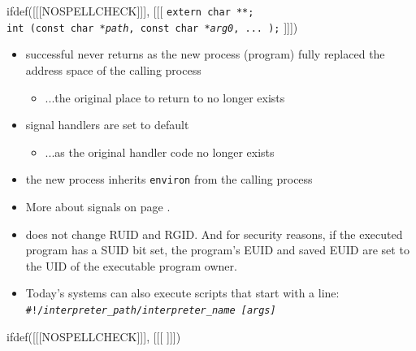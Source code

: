 \begin{slide}
ifdef([[[NOSPELLCHECK]]], [[[
\texttt{extern char **;\\
int (const char *\emph{path}, const char *\emph{arg0}, ... );}
]]])
\begin{itemize}
\item successful  never returns as the new process (program) fully
replaced the address space of the calling process
\begin{itemize}
\item ...the original place to return to no longer exists
\end{itemize}
\item signal handlers are set to default
\begin{itemize}
\item ...as the original handler code no longer exists
\end{itemize}
\item the new process inherits \texttt{environ} from the calling process
\end{itemize}
\end{slide}

\begin{itemize}
\item More about signals on page \pageref{SIGNALS}.
\item {} does not change RUID and RGID.  And for security reasons, if
the executed program has a SUID bit set, the program's EUID and saved EUID are
set to the UID of the executable program owner.
\item Today's systems can also execute scripts that start with a line:\\
\texttt{\#!/\emph{interpreter\_path}/\emph{interpreter\_name} \emph{[args]}}
\end{itemize}


ifdef([[[NOSPELLCHECK]]], [[[
]]])

